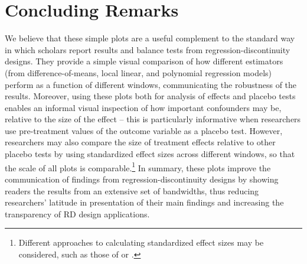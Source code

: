 \documentclass[letterpaper,twoside,12pt]{article}
\begin{document}
\section{Concluding Remarks}

We believe that these simple plots are a useful complement to the standard way in which scholars report results and balance tests from regression-discontinuity designs. They provide a simple visual comparison of how different estimators (from difference-of-means, local linear, and polynomial regression models) perform as a function of different windows, communicating the robustness of the results. Moreover, using these plots both for analysis of effects and placebo tests enables an informal visual inspection of how important confounders may be, relative to the size of the effect -- this is particularly informative when researchers use pre-treatment values of the outcome variable as a placebo test. However, researchers may also compare the size of treatment effects relative to other placebo tests by using standardized effect sizes across different windows, so that the scale of all plots is comparable.\footnote{Different approaches to calculating standardized effect sizes may be considered, such as those of \citet{glass1976} or \citet{ellis2010}.} In summary, these plots improve the communication of findings from regression-discontinuity designs by showing readers the results from an extensive set of bandwidths, thus reducing researchers' latitude in presentation of their main findings and increasing the transparency of RD design applications.



\clearpage
	

\end{document}

